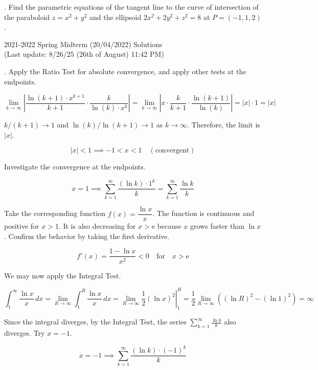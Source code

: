 \documentclass{article}
\begin{document}
\hfill

. Find the parametric equations of the tangent line to the curve of intersection of the paraboloid $z=x^2+y^2$ and the ellipsoid $2x^2+2y^2+z^2=8$ at $P=(-1,1,2)$.

\newpage

\begin{center}
2021-2022 Spring Midterm (20/04/2022) Solutions\\
(Last update: 8/26/25 (26th of August) 11:42 PM)
\end{center}

. Apply the Ratio Test for absolute convergence, and apply other tests at the endpoints.

\[\lim_{k\to\infty}\left|\frac{\ln(k+1)\cdot x^{k+1}}{k+1}\cdot\frac k{\ln(k)\cdot x^k}\right|=\lim_{k\to\infty}\left|x\cdot\frac{k}{k+1}\cdot\frac{\ln(k+1)}{\ln(k)}\right|=|x|\cdot1=|x|\]

\hfill

\noindent $k/(k+1)\to1$ and $\ln(k)/\ln(k+1)\to1$ as $k\to\infty$. Therefore, the limit is $|x|$.

\[|x|<1\implies-1<x<1\quad(\text{convergent})\]


\hfill

\noindent Investigate the convergence at the endpoints.

\[x=1\implies \sum_{k=1}^{\infty}\frac{(\ln k)\cdot 1^k}{k}=\sum_{k=1}^{\infty}\frac{\ln k}{k}\]

\hfill

\noindent Take the corresponding function $f(x)=\dfrac{\ln x}x$. The function is continuous and positive for $x>1$. It is also decreasing for $x>\mathrm{e}$ because $x$ grows faster than $\ln x$. Confirm the behavior by taking the first derivative.

\[f'(x)=\frac{1-\ln x}{x^2}<0\quad\text{for}\quad x>\mathrm e\]

\hfill

\noindent We may now apply the Integral Test.

\[\int_1^{\infty}\frac{\ln x}x\,dx=\lim_{R\to\infty}\int_1^R\frac{\ln x}x\,dx=\lim_{R\to\infty}\left.\frac12\left(\ln x\right)^2\right|_1^R=\frac12\lim_{R\to\infty}\left((\ln R)^2-(\ln1)^2\right)=\infty\]

\hfill

\noindent Since the integral diverges, by the Integral Test, the series $\displaystyle\sum_{k=1}^{\infty}\frac{\ln k}k$ also diverges. Try $x=-1$.

\[x=-1\implies \sum_{k=1}^{\infty}\frac{(\ln k)\cdot(-1)^k}{k}\]
\end{document}
